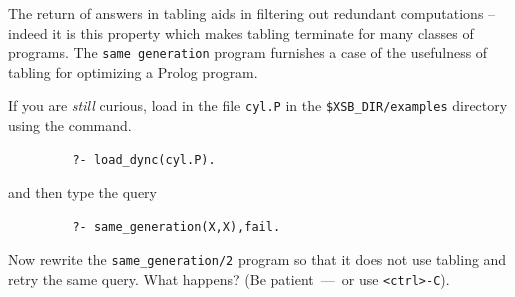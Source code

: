 The return of answers in tabling aids in filtering out redundant
computations -- indeed it is this property which makes tabling
terminate for many classes of programs.  The {\tt same generation}
program furnishes a case of the usefulness of tabling for optimizing a
Prolog program.

\begin{exercise} \label{ex:samegen}
If you are {\em still} curious, load in the file {\tt cyl.P} in the
\verb|$XSB_DIR/examples| directory using the command.
\begin{verbatim}
         ?- load_dync(cyl.P).
\end{verbatim}
and then type the query
\begin{verbatim}
         ?- same_generation(X,X),fail.
\end{verbatim}
Now rewrite the {\tt same\_generation/2} program so that it does not
use tabling and retry the same query.  What happens?  (Be
patient~---~or use \verb|<ctrl>-C|).\fillBox
\end{exercise}

